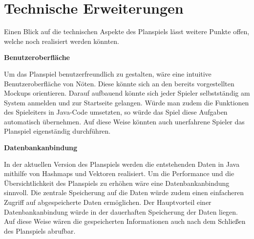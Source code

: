 \section{Technische Erweiterungen}
\label{sec:fazit-fachkonzept}

Einen Blick auf die technischen Aspekte des Planspiels lässt weitere Punkte offen, welche noch realisiert werden könnten. 

\textbf{Benutzeroberfläche}

Um das Planspiel benutzerfreundlich zu gestalten, wäre eine intuitive Benutzeroberfläche von Nöten. Diese könnte sich an den bereits vorgestellten Mockups orientieren. Darauf aufbauend könnte sich jeder Spieler selbstständig am System anmelden und zur Startseite gelangen. Würde man zudem die Funktionen des Spieleiters in Java-Code umsetzten, so würde das Spiel diese Aufgaben automatisch übernehmen. Auf diese Weise könnten auch unerfahrene Spieler das Planspiel eigenständig durchführen. 

\textbf{Datenbankanbindung}

In der aktuellen Version des Planspiels werden die entstehenden Daten in Java mithilfe von Hashmaps und Vektoren realisiert. Um die Performance und die Übersichtlichkeit des Planspiels zu erhöhen wäre eine Datenbankanbindung sinnvoll. Die zentrale Speicherung auf die Daten würde zudem einen einfacheren Zugriff auf abgespeicherte Daten ermöglichen. Der Hauptvorteil einer Datenbankanbindung würde in der dauerhaften Speicherung der Daten liegen. Auf diese Weise wären die gespeicherten Informationen auch nach dem Schließen des Planspiels abrufbar.
